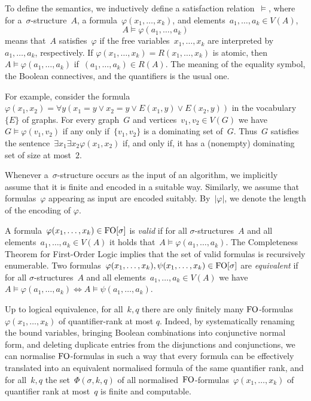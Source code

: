\documentclass[11pt]{article}
\numberwithin{equation}{section}
\newcommand{\FO}{\textup{FO}}
\renewcommand{\phi}{\varphi}
\begin{document}
To define the semantics, we inductively define a
satisfaction relation~$\models$, where for a~$\sigma$-structure~$A$, a
formula~$\phi(x_1,\ldots,x_k)$, and elements~$a_1,\ldots,a_k\in V(A)$,
\[
A\models\phi(a_1,\ldots,a_k)
\]
means that~$A$ satisfies~$\phi$ if the free variables~$x_1,\ldots,x_k$
are interpreted by~$a_1,\ldots,a_k$, respectively. If
$\phi(x_1,\ldots,x_k)=R(x_1,\ldots,x_k)$ is atomic, then
$A\models\phi(a_1,\ldots,a_k)$ if~$(a_1,\ldots,a_k)\in R(A)$. The
meaning of the equality symbol, the Boolean connectives, and the
quantifiers is the usual one.

For example, consider the formula~$\phi(x_1,x_2)=\forall y(x_1=y\vee
x_2=y\vee E(x_1,y)\vee E(x_2,y))$ in the vocabulary~$\{E\}$ of
graphs. For every graph~$G$ and vertices~$v_1,v_2\in V(G)$ we
have~$G\models\phi(v_1,v_2)$ if any only if~$\{v_1,v_2\}$ is a
dominating set of~$G$. Thus~$G$ satisfies the sentence~$\exists
x_1\exists x_2\phi(x_1,x_2)$ if, and only if, it has a
(nonempty)
dominating set of size at most~$2$.

Whenever a~$\sigma$-structure occurs as the input of an algorithm, we
implicitly assume that it is finite and encoded in a suitable
way. Similarly, we assume that formulas~$\phi$ appearing as input are
encoded suitably. By~$|\phi|$, we denote the length of the encoding of
$\phi$.

A formula~$\phi(x_1,\ldots,x_k)\in\FO[\sigma]$ is \emph{valid} if for all
$\sigma$-structures~$A$ and all elements~$a_1,\ldots,a_k\in V(A)$
it holds that~$A\models\phi(a_1,\ldots,a_k)$. 
The Completeness Theorem for First-Order Logic implies that the set of
valid formulas is recursively enumerable. 
Two formulas~$\phi(x_1,\ldots,x_k),\psi(x_1,\ldots,x_k)\in\FO[\sigma]$ are \emph{equivalent} if for all
$\sigma$-structures~$A$ and all elements~$a_1,\ldots,a_k\in V(A)$ we have~$A\models\phi(a_1,\ldots,a_k)\iff A\models\psi(a_1,\ldots,a_k)$. 

Up to logical equivalence, for all~$k,q$ there are only finitely many
$\FO$-formulas~$\phi(x_1,\ldots,x_k)$ of quantifier-rank at most
$q$. Indeed, by systematically renaming the bound variables, bringing Boolean
combinations into conjunctive normal form, and deleting duplicate
entries from the disjunctions and conjunctions, we can normalise
$\FO$-formulas in such a way that every formula can be effectively
translated into an equivalent normalised formula of the same
quantifier rank, and for all~$k,q$ the set~$\Phi(\sigma,k,q)$ of all
normalised~$\FO$-formulas~$\phi(x_1,\ldots,x_k)$ of quantifier rank at
most~$q$ is finite and computable.
\end{document}
